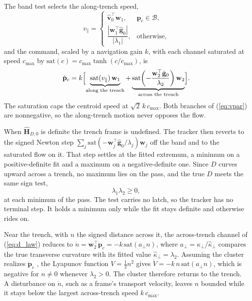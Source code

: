 \documentclass[lettersize,journal]{IEEEtran}
\begin{document}
The band test selects the along-trench speed,
\begin{equation}
    v_\parallel =
    \begin{cases}
        \hat{\mathbf{v}}_0^\top \mathbf{w}_1,
            & \mathbf{p}_c \in \mathcal{B}, \\[6pt]
        \dfrac{|\mathbf{w}_1^\top \hat{\mathbf{g}}_0|}{|\lambda_1|},
            & \text{otherwise},
    \end{cases}
    \label{eq:vpar}
\end{equation}
and the command, scaled by a navigation gain $k$, with each channel saturated at speed
$c_{\max}$ by $\mathrm{sat}(c) = c_{\max}\tanh(c/c_{\max})$, is
\begin{equation}
    \dot{\mathbf{p}}_c = k\Bigl[
    \underbrace{\mathrm{sat}(v_\parallel)\,\mathbf{w}_1}_{\text{along the trench}}
    + \underbrace{\mathrm{sat}\!\left(-\frac{\mathbf{w}_2^\top
      \hat{\mathbf{g}}_0}{\lambda_2}\right)\mathbf{w}_2}_{\text{across the trench}}\Bigr].
    \label{eq:d_law}
\end{equation}
The saturation caps the centroid speed at $\sqrt{2}\,k\,c_{\max}$.
Both branches of (\ref{eq:vpar}) are nonnegative, so the along-trench
motion never opposes the flow.

When $\hat{\mathbf{H}}_{D,0}$ is definite the trench frame is undefined.
The tracker then reverts to the signed Newton step
$\sum_j \mathrm{sat}(-\mathbf{w}_j^\top\hat{\mathbf{g}}_0/
\lambda_j)\mathbf{w}_j$ off the band and to the saturated flow on it.
That step settles at the fitted extremum, a minimum on a
positive-definite fit and a maximum on a negative-definite one. Since $D$
curves upward across a trench, no maximum lies on the pass, and the true $D$
meets the same sign test,
\begin{equation}
    \lambda_1 \lambda_2 \geq 0,
    \label{eq:d_capture}
\end{equation}
at each minimum of the pass. The test carries no latch, so the tracker
has no terminal step. It holds a minimum only while the fit stays
definite and otherwise rides on.

Near the trench, with $n$ the signed distance across it, the across-trench
channel of (\ref{eq:d_law}) reduces to
$\dot{n} = \mathbf{w}_2^\top\dot{\mathbf{p}}_c = -k\,\mathrm{sat}(a_\perp n)$,
where $a_\perp = \kappa_\perp/\hat{\kappa}_\perp$ compares the true
transverse curvature with its fitted value $\hat{\kappa}_\perp = \lambda_2$.
Assuming the cluster realizes $\dot{\mathbf{p}}_c$ \cite{37,3}, the
Lyapunov function $V = \tfrac{1}{2}n^2$ gives
$\dot{V} = -k\,n\,\mathrm{sat}(a_\perp n)$, which is negative for
$n \neq 0$ whenever $\lambda_2 > 0$. The cluster therefore returns to the
trench. A disturbance on $\dot{n}$, such as a frame's transport velocity,
leaves $n$ bounded while it stays below the largest across-trench speed
$k\,c_{\max}$.
\end{document}

